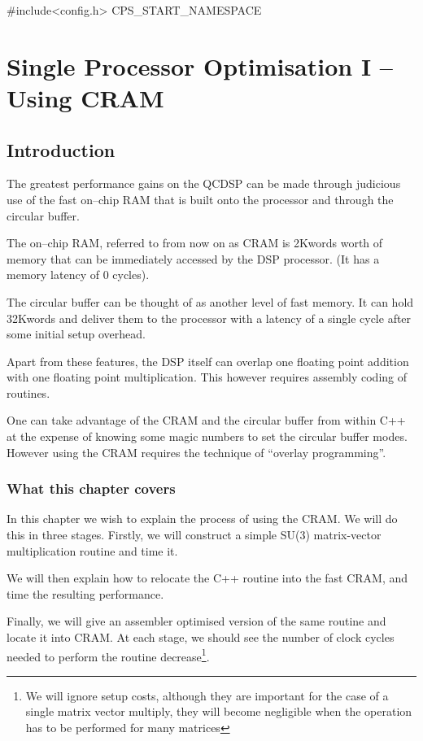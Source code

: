 #include<config.h>
CPS_START_NAMESPACE
\chapter{Single Processor Optimisation I -- Using CRAM}
\section{Introduction}
The greatest performance gains on the QCDSP can be made through
judicious use of the fast on--chip RAM that is built onto the 
processor and through the circular buffer.

The on--chip RAM, referred to from now on as CRAM is 2Kwords
worth of memory that can be immediately accessed
by the DSP processor. (It has a memory latency of 0 cycles).
 
The circular buffer can be thought of as another level of fast
memory. It can hold 32Kwords and deliver them to the processor
with a latency of a single cycle after some initial setup overhead.

Apart from these features, the DSP itself can overlap one floating
point addition with one floating point multiplication. This however
requires assembly coding of routines. 

One can take advantage of the CRAM and the circular buffer
from within C++ at the expense of knowing some magic numbers to set
the circular buffer modes. However using the CRAM requires the 
technique of ``overlay programming''.

\subsection{What this chapter covers}
In this chapter we wish to explain the process of using the CRAM.
We will do this in three stages. Firstly, we will construct a 
simple SU(3) matrix-vector multiplication routine and time it.

We will then explain how to relocate the C++ routine into the fast
CRAM, and time the resulting performance.

Finally, we will give an assembler optimised version of the same
routine and locate it into CRAM. At each stage, we should see the
number of clock cycles needed to perform the routine decrease\footnote{We will
ignore setup costs, although they are important for the case of a single
matrix vector multiply, they will become negligible when the operation
has to be performed for many matrices}. 

